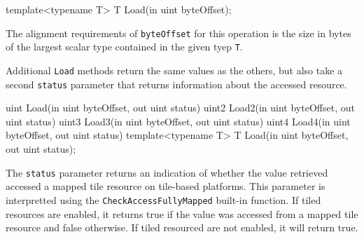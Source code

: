 \begin{HLSL}
  template<typename T>
  T Load(in uint byteOffset);
\end{HLSL}

The alignment requirements of \texttt{byteOffset} for this operation is the size in bytes of the largest
scalar type contained in the given tyep \texttt{T}.

Additional \texttt{Load} methods return the same values as the others,
but also take a second \texttt{status} parameter that returns information about the accessed resource.
\begin{HLSL}
  uint Load(in uint byteOffset, out uint status)
  uint2 Load2(in uint byteOffset, out uint status)
  uint3 Load3(in uint byteOffset, out uint status)
  uint4 Load4(in uint byteOffset, out uint status)
  template<typename T>
  T Load(in uint byteOffset, out uint status);
\end{HLSL}

The \texttt{status} parameter returns an indication of whether the value retrieved accessed a mapped tile
resource on tile-based platforms. This parameter is interpretted using the \texttt{CheckAccessFullyMapped}
built-in function. If tiled resources are enabled, it returns true if the value was accessed from a mapped
tile resource and false otherwise. If tiled resourced are not enabled, it will return true.


